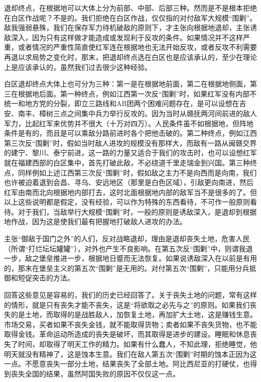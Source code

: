 退却终点，在根据地可以大体上分为前部、中部、后部三种。然而是不是根本拒绝在白区作战呢？不是的。我们拒绝在白区作战，仅仅指的对付敌军大规模“围剿”。敌我强弱悬殊，我们在保存军力待机破敌的原则下，才主张向根据地退却，主张诱敌深入，因为只有这样做才能造成或发现利于反攻的条件。如果情况并不这样严重，或者情况的严重性简直使红军连在根据地也无法开始反攻，或者反攻不利需要再退以求局势之变化时，那末，把退却终点选在白区也是应该承认的，至少在理论上是应该承认的，虽然我们过去很少这种经验。

白区退却终点大体上也可分为三种：第一是在根据地前面，第二在根据地侧面，第三在根据地后面。第一种终点，例如江西第一次反“围剿”时，如果红军没有内部不统一和地方党的分裂，即立三路线和AB团两个困难问题存在，是可以设想在吉安、南丰、樟树三点之间集中兵力举行反攻的。因为当时从赣抚两河间前进的敌人军力，比起红军来优势并不很大（十万对四万）。人民条件虽不如根据地，但阵地条件是有的，而且是可以乘敌分路前进时各个把他击破的。第二种终点，例如江西第三次反“围剿”时，假如当时敌人进攻的规模没有那样大，而敌有一路从闽赣交界的建宁、黎川、泰宁前进，这一路的力量又适合于我们的攻击时，也可以设想红军就在福建西部的白区集中，首先打破此敌，不必绕道千里走瑞金到兴国。第三种终点，同样例如上述江西第三次反“围剿”时，假如敌之主力不是向西而是向南，我们也许被迫着退到会昌、寻乌、安远地区（那里是白色区域），引敌更向南进，然后红军由南而北向根据地内部打去，这时北面根据地内部的敌军当不是很多的了。但以上这些说明都是假定，没有经验，可以作为特殊的东西看待，不可作一般原则看待。对于我们，当敌举行大规模“围剿”时，一般的原则是诱敌深入，是退却到根据地作战，因为这是使我们最有把握地打破敌人进攻的办法。

主张“御敌于国门之外”的人们，反对战略退却，理由是退却丧失土地，危害人民（所谓“打烂坛坛罐罐”），对外也产生不良影响。在第五次反“围剿”中，则谓我退一步，敌之堡垒推进一步，根据地日蹙而无法恢复。如果说诱敌深入在以前是有用的，那末在堡垒主义的第五次“围剿”是无用的。对付第五次“围剿”，只能用分兵抵御和短促突击的方法。

回答这些意见是容易的，我们的历史已经回答了。关于丧失土地的问题，常有这样的情形，就是只有丧失才能不丧失，这是“将欲取之必先与之”的原则。如果我们丧失的是土地，而取得的是战胜敌人，加恢复土地，再加扩大土地，这是赚钱生意。市场交易，买者如果不丧失金钱，就不能取得货物；卖者如果不丧失货物，也不能取得金钱。革命运动所造成的丧失是破坏，而其取得是进步的建设。睡眠和休息丧失了时间，却取得了明天工作的精力。如果有什么蠢人，不知此理，拒绝睡觉，他明天就没有精神了，这是蚀本生意。我们在敌人第五次“围剿”时期的蚀本正因为这一点。不愿意丧失一部分土地，结果丧失了全部土地。阿比西尼亚的打硬仗，也得到丧失全国的结果，虽然阿国失败的原因不仅仅这一点。

